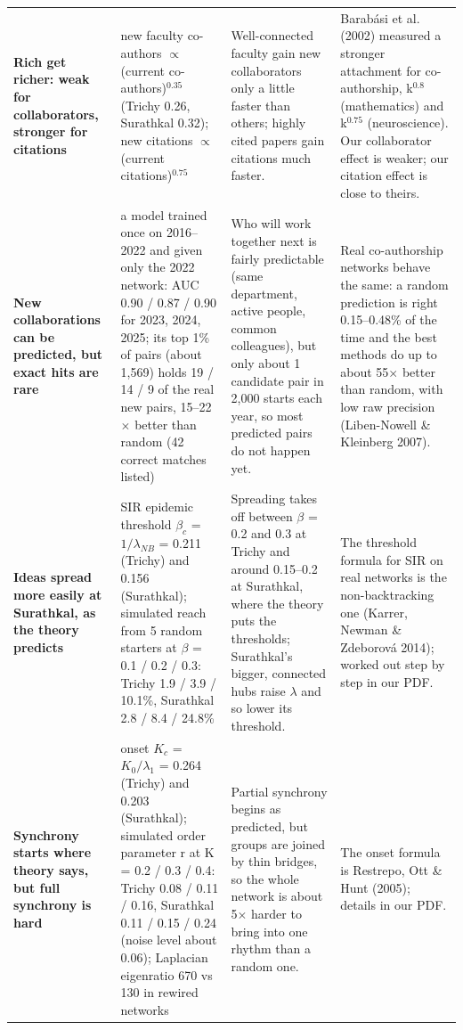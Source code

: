 \begin{tabular}{@{}p{2.5cm}p{4.4cm}p{4.5cm}p{5.4cm}@{}}
\addlinespace[1.5pt]
\textbf{Rich get richer: weak for collaborators, stronger for citations} & new faculty co-authors $\propto$ (current co-authors)$^{0.35}$ (Trichy 0.26, Surathkal 0.32); new citations $\propto$ (current citations)$^{0.75}$ & Well-connected faculty gain new collaborators only a little faster than others; highly cited papers gain citations much faster. & Barab\'asi et al. (2002) measured a stronger attachment for co-authorship, k$^{0.8}$ (mathematics) and k$^{0.75}$ (neuroscience). Our collaborator effect is weaker; our citation effect is close to theirs. \\
\addlinespace[1.5pt]
\textbf{New collaborations can be predicted, but exact hits are rare} & a model trained once on 2016--2022 and given only the 2022 network: AUC 0.90 / 0.87 / 0.90 for 2023, 2024, 2025; its top 1\% of pairs (about 1,569) holds 19 / 14 / 9 of the real new pairs, 15--22$\times$ better than random (42 correct matches listed) & Who will work together next is fairly predictable (same department, active people, common colleagues), but only about 1 candidate pair in 2,000 starts each year, so most predicted pairs do not happen yet. & Real co-authorship networks behave the same: a random prediction is right 0.15--0.48\% of the time and the best methods do up to about 55$\times$ better than random, with low raw precision (Liben-Nowell \& Kleinberg 2007). \\
\addlinespace[1.5pt]
\textbf{Ideas spread more easily at Surathkal, as the theory predicts} & SIR epidemic threshold $\beta_c$ = $1/\lambda_{NB}$ = 0.211 (Trichy) and 0.156 (Surathkal); simulated reach from 5 random starters at $\beta$ = 0.1 / 0.2 / 0.3: Trichy 1.9 / 3.9 / 10.1\%, Surathkal 2.8 / 8.4 / 24.8\% & Spreading takes off between $\beta$ = 0.2 and 0.3 at Trichy and around 0.15--0.2 at Surathkal, where the theory puts the thresholds; Surathkal's bigger, connected hubs raise $\lambda$ and so lower its threshold. & The threshold formula for SIR on real networks is the non-backtracking one (Karrer, Newman \& Zdeborov\'a 2014); worked out step by step in our PDF. \\
\addlinespace[1.5pt]
\textbf{Synchrony starts where theory says, but full synchrony is hard} & onset $K_c$ = $K_0/\lambda_1$ = 0.264 (Trichy) and 0.203 (Surathkal); simulated order parameter r at K = 0.2 / 0.3 / 0.4: Trichy 0.08 / 0.11 / 0.16, Surathkal 0.11 / 0.15 / 0.24 (noise level about 0.06); Laplacian eigenratio 670 vs 130 in rewired networks & Partial synchrony begins as predicted, but groups are joined by thin bridges, so the whole network is about 5$\times$ harder to bring into one rhythm than a random one. & The onset formula is Restrepo, Ott \& Hunt (2005); details in our PDF. \\

\end{tabular}
